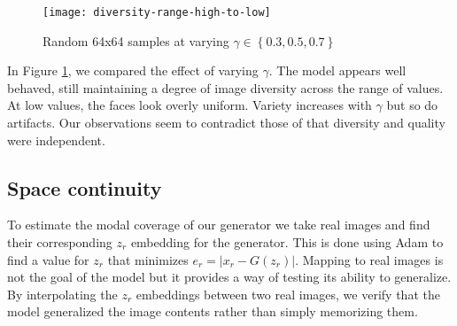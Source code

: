 \documentclass[english]{article}
\begin{document}
\begin{figure}
\centering{}\texttt{[image: diversity-range-high-to-low]}\caption{Random 64x64 samples at varying $\gamma\in\left\{ 0.3,0.5,0.7\right\} $\label{fig:randvar}}
\end{figure}


In Figure \ref{fig:randvar}, we compared the effect of varying $\gamma$.
The model appears well behaved, still maintaining a degree of image
diversity across the range of values. At low values, the faces look
overly uniform. Variety increases with $\gamma$ but so do artifacts.
Our observations seem to contradict those of \cite{poole2016improved}
that diversity and quality were independent.


\subsection{Space continuity}

To estimate the modal coverage of our generator we take real images
and find their corresponding $z_{r}$ embedding for the generator.
This is done using Adam to find a value for $z_{r}$ that minimizes
$e_{r}=|x_{r}-G(z_{r})|$. Mapping to real images is not the goal
of the model but it provides a way of testing its ability to generalize.
By interpolating the $z_{r}$ embeddings between two real images,
we verify that the model generalized the image contents rather than
simply memorizing them.
\end{document}
